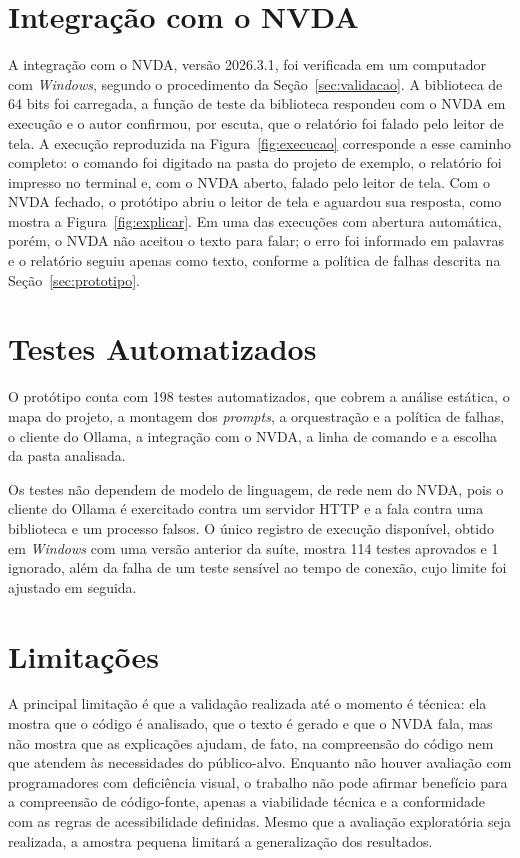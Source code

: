 \documentclass[
    12pt,                   %
    openright,              %
    oneside,                %
    a4paper,                %
    sumario=tradicional,    %
    english,                %
    brazil,                 %
    ]{abntex2}
\begin{document}
\section{Integração com o NVDA}\label{sec:resultnvda}

A integração com o NVDA, versão 2026.3.1, foi verificada em um computador com \textit{Windows}, segundo o procedimento da Seção~\ref{sec:validacao}. A biblioteca de 64 bits foi carregada, a função de teste da biblioteca respondeu com o NVDA em execução e o autor confirmou, por escuta, que o relatório foi falado pelo leitor de tela. A execução reproduzida na Figura~\ref{fig:execucao} corresponde a esse caminho completo: o comando foi digitado na pasta do projeto de exemplo, o relatório foi impresso no terminal e, com o NVDA aberto, falado pelo leitor de tela. Com o NVDA fechado, o protótipo abriu o leitor de tela e aguardou sua resposta, como mostra a Figura~\ref{fig:explicar}. Em uma das execuções com abertura automática, porém, o NVDA não aceitou o texto para falar; o erro foi informado em palavras e o relatório seguiu apenas como texto, conforme a política de falhas descrita na Seção~\ref{sec:prototipo}.


\section{Testes Automatizados}\label{sec:resulttestes}

O protótipo conta com 198 testes automatizados, que cobrem a análise estática, o mapa do projeto, a montagem dos \textit{prompts}, a orquestração e a política de falhas, o cliente do Ollama, a integração com o NVDA, a linha de comando e a escolha da pasta analisada.

Os testes não dependem de modelo de linguagem, de rede nem do NVDA, pois o cliente do Ollama é exercitado contra um servidor HTTP e a fala contra uma biblioteca e um processo falsos. O único registro de execução disponível, obtido em \textit{Windows} com uma versão anterior da suíte, mostra 114 testes aprovados e 1 ignorado, além da falha de um teste sensível ao tempo de conexão, cujo limite foi ajustado em seguida.

\section{Limitações}\label{sec:limitacoes}

A principal limitação é que a validação realizada até o momento é técnica: ela mostra que o código é analisado, que o texto é gerado e que o NVDA fala, mas não mostra que as explicações ajudam, de fato, na compreensão do código nem que atendem às necessidades do público-alvo. Enquanto não houver avaliação com programadores com deficiência visual, o trabalho não pode afirmar benefício para a compreensão de código-fonte, apenas a viabilidade técnica e a conformidade com as regras de acessibilidade definidas. Mesmo que a avaliação exploratória seja realizada, a amostra pequena limitará a generalização dos resultados.
\end{document}
